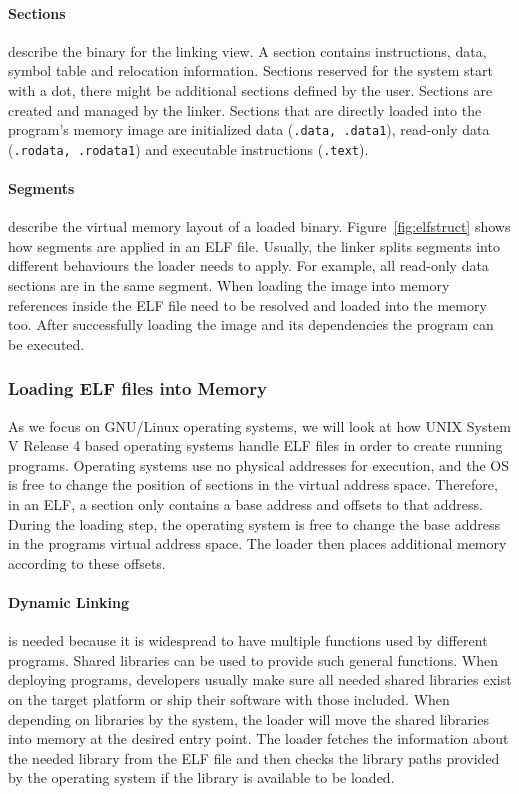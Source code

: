 \paragraph{Sections} describe the binary for the linking view. A section
contains instructions, data, symbol table and relocation information. Sections
reserved for the system start with a dot, there might be additional sections
defined by the user. Sections are created and managed by the linker. Sections
that are directly loaded into the program's memory image are initialized data
(\texttt{.data, .data1}), read-only data (\texttt{.rodata, .rodata1}) and
executable instructions (\texttt{.text}).

\paragraph{Segments} describe the virtual memory layout of a loaded binary.
Figure~\ref{fig:elfstruct} shows how segments are applied in an ELF file.
Usually, the linker splits segments into different behaviours the loader needs
to apply. For example, all read-only data sections are in the same segment. When
loading the image into memory references inside the ELF file need to be resolved
and loaded into the memory too. After successfully loading the image and its
dependencies the program can be executed.

\subsubsection{Loading ELF files into Memory}

As we focus on GNU/Linux operating systems, we will look at how UNIX System V
Release 4 based operating systems handle ELF files in order to create running
programs. Operating systems use no physical addresses for execution, and the OS
is free to change the position of sections in the virtual address space.
Therefore, in an ELF, a section only contains a base address and offsets to that
address. During the loading step, the operating system is free to change the
base address in the programs virtual address space. The loader then places
additional memory according to these offsets.

\paragraph{Dynamic Linking} is needed because it is widespread to have multiple
functions used by different programs. Shared libraries can be used to provide
such general functions. When deploying programs, developers usually make sure
all needed shared libraries exist on the target platform or ship their software
with those included. When depending on libraries by the system, the loader will
move the shared libraries into memory at the desired entry point. The loader
fetches the information about the needed library from the ELF file and then
checks the library paths provided by the operating system if the library is
available to be loaded.

